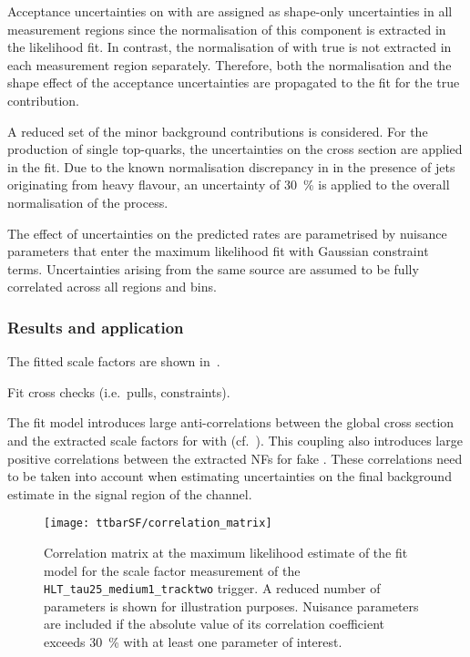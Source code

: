 Acceptance uncertainties on \ttbar with \faketauhadvis are assigned as
shape-only uncertainties in all measurement regions since the
normalisation of this component is extracted in the likelihood fit.
In contrast, the normalisation of \ttbar with true \tauhadvis is not
extracted in each measurement region separately. Therefore, both the
normalisation and the shape effect of the \ttbar acceptance
uncertainties are propagated to the fit for the true \tauhadvis
contribution.

A reduced set of the minor background contributions is considered. For
the production of single top-quarks, the uncertainties on the cross
section are applied in the fit. Due to the known normalisation
discrepancy in \Vjets in the presence of jets originating from heavy
flavour, an uncertainty of \SI{30}{\percent} is applied to the overall
normalisation of the process.

The effect of uncertainties on the predicted rates are parametrised by
nuisance parameters that enter the maximum likelihood fit with
Gaussian constraint terms. Uncertainties arising from the same source
are assumed to be fully correlated across all regions and bins.



\subsubsection{Results and application}

The fitted scale factors are shown in~.

Fit cross checks (i.e.\ pulls, constraints).

The fit model introduces large anti-correlations between the global
\ttbar cross section and the extracted scale factors for \ttbar with
\faketauhadvis (cf.~).  This
coupling also introduces large positive correlations between the
extracted NFs for fake \tauhadvis. These correlations need to be taken
into account when estimating uncertainties on the final background
estimate in the signal region of the \hadhad channel.

\begin{figure}[htbp]
  \centering
  \texttt{[image: ttbarSF/correlation\_matrix]}

  \caption{Correlation matrix at the maximum likelihood estimate of
    the fit model for the scale factor measurement of the
    \texttt{HLT\_tau25\_medium1\_tracktwo} trigger. A reduced number
    of parameters is shown for illustration purposes. Nuisance
    parameters are included if the absolute value of its correlation
    coefficient exceeds \SI{30}{\percent} with at least one parameter
    of interest.}
  \label{fig:ttbarSF_corr_matrix}
\end{figure}

